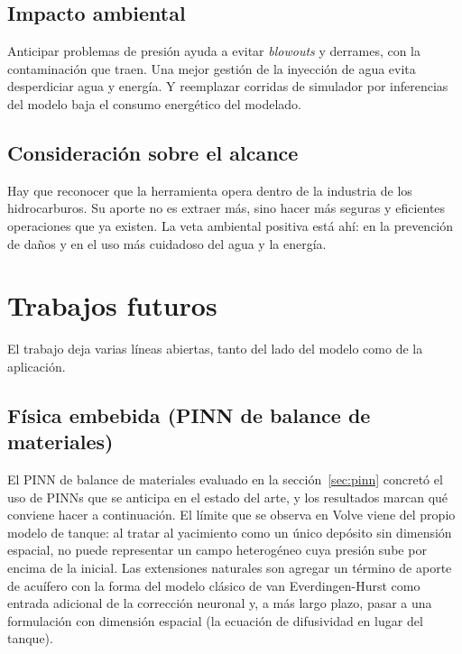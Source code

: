 \documentclass[12pt,a4paper]{article}
\begin{document}
\subsection{Impacto ambiental}

Anticipar problemas de presión ayuda a evitar \textit{blowouts} y derrames, con la
contaminación que traen. Una mejor gestión de la inyección de agua evita desperdiciar agua
y energía. Y reemplazar corridas de simulador por inferencias del modelo baja el consumo
energético del modelado.

\subsection{Consideración sobre el alcance}

Hay que reconocer que la herramienta opera dentro de la industria de los hidrocarburos. Su
aporte no es extraer más, sino hacer más seguras y eficientes operaciones que ya existen.
La veta ambiental positiva está ahí: en la prevención de daños y en el uso más cuidadoso
del agua y la energía.

\newpage
\section{Trabajos futuros}

El trabajo deja varias líneas abiertas, tanto del lado del modelo como de la aplicación.

\subsection{Física embebida (PINN de balance de materiales)}

El PINN de balance de materiales evaluado en la sección~\ref{sec:pinn} concretó el uso de
PINNs que se anticipa en el estado del arte, y los resultados marcan qué conviene hacer a
continuación. El límite que se observa en Volve viene del propio modelo de tanque: al
tratar al yacimiento como un único depósito sin dimensión espacial, no puede representar
un campo heterogéneo cuya presión sube por encima de la inicial. Las extensiones
naturales son agregar un término de aporte de acuífero con la forma del modelo clásico de
van Everdingen-Hurst como entrada adicional de la corrección neuronal y, a más largo
plazo, pasar a una formulación con dimensión espacial (la ecuación de difusividad en
lugar del tanque).
\end{document}
